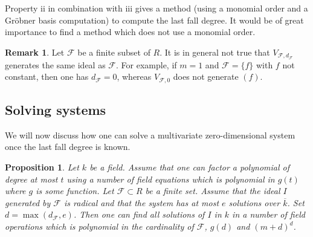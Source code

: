 \documentclass{amsart}
\theoremstyle{plain}
\newtheorem{proposition}[theorem]{Proposition}
\theoremstyle{definition}
\newtheorem{remark}[theorem]{Remark}
\begin{document}
Property ii in combination with iii gives a method (using a monomial order and a Gr\"obner basis computation) to compute the last fall degree. It would be of great importance to find a method which does not use a monomial order.

\begin{remark}
Let $\mathcal{F}$ be  a finite subset of $R$. It is in general not true that $V_{\mathcal{F},d_{\mathcal{F}}}$ generates the same ideal as $\mathcal{F}$. For example, if $m=1$ and $\mathcal{F}=\{f\}$ with $f$ not constant, then one has $d_{\mathcal{F}}=0$, whereas $V_{\mathcal{F},0}$ does not generate $(f)$.  
\end{remark}

\subsection{Solving systems}

We will now discuss how one can solve a multivariate zero-dimensional system once the last fall degree is known.

\begin{proposition} \label{666}
Let $k$ be a field. Assume that one can factor a polynomial of degree at most $t$ using a number of field equations which is polynomial in $g(t)$ where $g$ is some function. 
Let  $\mathcal{F} \subset R$ be a finite set.  Assume that the ideal $I$ generated by $\mathcal{F}$ is radical and that the system has at most $e$ solutions over $\overline{k}$. Set $d=\max(d_{\mathcal{F}},e)$. Then one can find all solutions of $I$ in $k$ in a number of field operations which is polynomial in the cardinality of $\mathcal{F}$, $g(d)$ and $(m+d)^d$.
\end{proposition}
\end{document}
